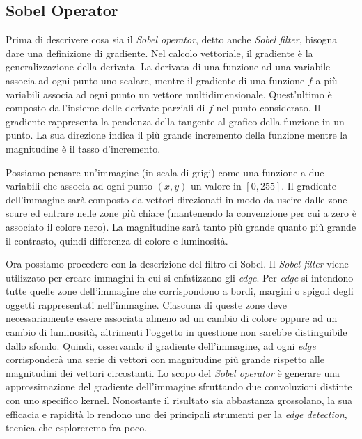 \clearpage
\subsection {Sobel Operator}
Prima di descrivere cosa sia il \textit{Sobel operator}, detto anche \textit{Sobel filter}, bisogna dare una definizione di gradiente.
Nel calcolo vettoriale, il gradiente è la generalizzazione della derivata.
La derivata di una funzione ad una variabile associa ad ogni punto uno scalare, mentre il gradiente di una funzione $f$ a più variabili associa ad ogni punto un vettore multidimensionale.
Quest'ultimo è composto dall'insieme delle derivate parziali di $f$ nel punto considerato.
Il gradiente rappresenta la pendenza della tangente al grafico della funzione in un punto.
La sua direzione indica il più grande incremento della funzione mentre la magnitudine è il tasso d'incremento.

Possiamo pensare un'immagine (in scala di grigi) come una funzione a due variabili che associa ad ogni punto $(x,y)$ un valore in $[0,255]$.
Il gradiente dell'immagine sarà composto da vettori direzionati in modo da uscire dalle zone scure ed entrare nelle zone più chiare (mantenendo la convenzione per cui a zero è associato il colore nero).
La magnitudine sarà tanto più grande quanto più grande il contrasto, quindi differenza di colore e luminosità.

Ora possiamo procedere con la descrizione del filtro di Sobel.
Il \textit{Sobel filter} viene utilizzato per creare immagini in cui si enfatizzano gli \textit{edge}.
Per \textit{edge} si intendono tutte quelle zone dell'immagine che corrispondono a bordi, margini o spigoli degli oggetti rappresentati nell'immagine.
Ciascuna di queste zone deve necessariamente essere associata almeno ad un cambio di colore oppure ad un cambio di luminosità, altrimenti l'oggetto in questione non sarebbe distinguibile dallo sfondo.
Quindi, osservando il gradiente dell'immagine, ad ogni \textit{edge} corrisponderà una serie di vettori con magnitudine più grande rispetto alle magnitudini dei vettori circostanti.
Lo scopo del \textit{Sobel operator} è generare una approssimazione del gradiente dell'immagine sfruttando due convoluzioni distinte con uno specifico kernel.
Nonostante il risultato sia abbastanza grossolano, la sua efficacia e rapidità lo rendono uno dei principali strumenti per la \textit{edge detection}, tecnica che esploreremo fra poco.

